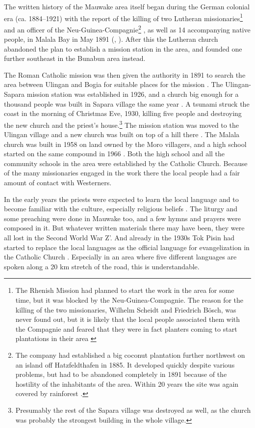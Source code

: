 The written history of the Mauwake area itself began during the German colonial era (ca. 1884--1921) with the report of the killing of two Lutheran missionaries\footnote{The Rhenish Mission had planned to start the work in the area for some time, but it was blocked by the Neu-Guinea-Compagnie. The reason for the killing of the two missionaries, Wilhelm Scheidt and Friedrich Bösch, was never found out, but it is likely that the local people associated them with the Compagnie and feared that they were in fact planters coming to start plantations in their area \citep[106--107]{WagnerEtAl1986}} and an officer of the Neu-Guinea-Compagnie\footnote{The company had established a big coconut plantation further northwest on an island off Hatzfeldthafen in 1885. It developed quickly despite  various problems, but had to be abandoned completely in 1891 because of the hostility of the inhabitants of the area. Within 20 years the site was again covered by rainforest \citep[450--51]{Tranel1952}.} , as well as 14 accompanying native people, in Malala Bay in May 1891 (\citealt[454]{Tranel1952}, \citealt[106--109]{WagnerEtAl1986}).  After this the Lutheran church abandoned the plan to establish a mission station in the area, and founded one further southeast in the Bunabun area instead.

The Roman Catholic mission was then given the authority in 1891 to search the area between Ulingan and Bogia for suitable places for the mission \citep[8]{Duamba1996}.  The Ulingan-Sapara mission station was established in 1926, and a church big enough for a thousand people was built in Sapara village the same year \citep[21]{BrummEtAl1995}%
.  A tsunami struck the coast in the morning of Christmas Eve, 1930, killing five people and destroying the new church and the priest's house.\footnote{Presumably the rest of the Sapara village was destroyed as well, as the church was probably the strongest building in the whole village.}  The mission station was moved to the Ulingan village and a new church was built on top of a hill there \citep[20--21]{Davies1999}. The Malala church was built in 1958 on land owned by the Moro villagers, and a high school started on the same compound in 1966 \citep[45]{BrummEtAl1995}%
. Both the high school and all the community schools in the area were established by the Catholic Church.  Because of the many missionaries engaged in the work there the local people had a fair amount of contact with Westerners.

In the early years the priests were expected to learn the local language and to become familiar with the culture, especially religious beliefs \citep[25]{BrummEtAl1995}%
. The liturgy and some preaching were done in Mauwake too, and a few hymns and prayers were composed in it. But whatever written materials there may have been, they were all lost in the Second World War Z'\citep[3--4]{Graggen1971}.  And already in the 1930s Tok Pisin had started to replace the local languages as the official language for evangelization in the Catholic Church \citep[179]{BrummEtAl1995}%
.  Especially in an area where five different languages are spoken along a 20 km stretch of the road, this is understandable.  

